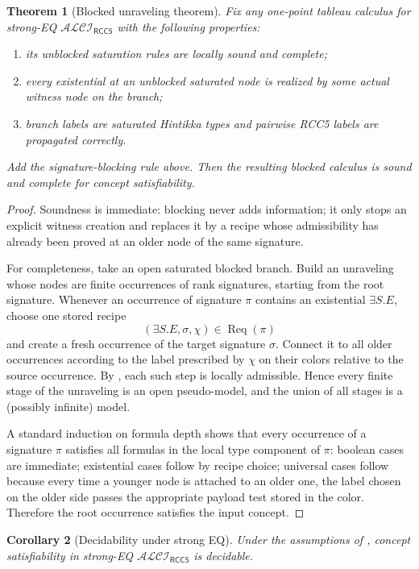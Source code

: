 \documentclass[11pt]{article}
\newtheorem{theorem}{Theorem}[section]
\newtheorem{corollary}[theorem]{Corollary}
\theoremstyle{definition}
\newcommand{\ALCIRCCFive}{\mathcal{ALCI}_{\mathsf{RCC5}}}
\newcommand{\Req}{\operatorname{Req}}
\begin{document}
\begin{theorem}[Blocked unraveling theorem]\label{thm:blocked-unraveling}
Fix any one-point tableau calculus for strong-EQ $\ALCIRCCFive$ with the following properties:
\begin{enumerate}[label=(\roman*)]
  \item its unblocked saturation rules are locally sound and complete;
  \item every existential at an unblocked saturated node is realized by some actual witness node on the branch;
  \item branch labels are saturated Hintikka types and pairwise RCC5 labels are propagated correctly.
\end{enumerate}
Add the signature-blocking rule above. Then the resulting blocked calculus is sound and complete for concept satisfiability.
\end{theorem}

\begin{proof}
Soundness is immediate: blocking never adds information; it only stops an explicit witness creation and replaces it by a recipe whose admissibility has already been proved at an older node of the same signature.

For completeness, take an open saturated blocked branch. Build an unraveling whose nodes are finite occurrences of rank signatures, starting from the root signature. Whenever an occurrence of signature $\pi$ contains an existential $\exists S.E$, choose one stored recipe
\[
(\exists S.E,\sigma,\chi)\in\Req(\pi)
\]
and create a fresh occurrence of the target signature $\sigma$. Connect it to all older occurrences according to the label prescribed by $\chi$ on their colors relative to the source occurrence. By , each such step is locally admissible. Hence every finite stage of the unraveling is an open pseudo-model, and the union of all stages is a (possibly infinite) model.

A standard induction on formula depth shows that every occurrence of a signature $\pi$ satisfies all formulas in the local type component of $\pi$: boolean cases are immediate; existential cases follow by recipe choice; universal cases follow because every time a younger node is attached to an older one, the label chosen on the older side passes the appropriate payload test stored in the color. Therefore the root occurrence satisfies the input concept.
\end{proof}

\begin{corollary}[Decidability under strong EQ]
Under the assumptions of , concept satisfiability in strong-EQ $\ALCIRCCFive$ is decidable.
\end{corollary}
\end{document}
